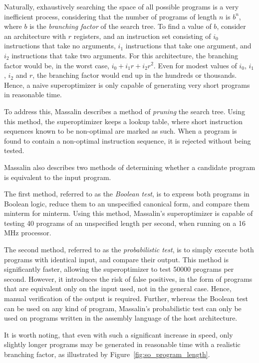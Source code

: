 \documentclass[a4paper,11pt]{kth-mag}
\begin{document}
Naturally, exhaustively searching the space of all possible programs is a very inefficient process, considering that the number of programs of length $n$ is $b^n$, where $b$ is the \emph{branching factor} of the search tree.
To find a value of $b$, consider an architecture with $r$ registers, and an instruction set consisting of $i_0$ instructions that take no arguments, $i_1$ instructions that take one argument, and $i_2$ instructions that take two arguments.
For this architecture, the branching factor would be, in the worst case, $i_0+i_1r+i_2r^2$.
Even for modest values of $i_0$, $i_1$, $i_2$ and $r$, the branching factor would end up in the hundreds or thousands.
Hence, a naive superoptimizer is only capable of generating very short programs in reasonable time.

To address this, Massalin describes a method of \emph{pruning} the search tree.
Using this method, the superoptimizer keeps a lookup table, where short instruction sequences known to be non-optimal are marked as such.
When a program is found to contain a non-optimal instruction sequence, it is rejected without being tested.

Massalin also describes two methods of determining whether a candidate program is equivalent to the input program.

The first method, referred to as the \emph{Boolean test}, is to express both programs in Boolean logic, reduce them to an unspecified canonical form, and compare them minterm for minterm.
Using this method, Massalin's superoptimizer is capable of testing 40 programs of an unspecified length per second, when running on a 16 MHz processor.

The second method, referred to as the \emph{probabilistic test}, is to simply execute both programs with identical input, and compare their output.
This method is significantly faster, allowing the superoptimizer to test 50000 programs per second.
However, it introduces the risk of false positives, in the form of programs that are equivalent only on the input used, not in the general case.
Hence, manual verification of the output is required.
Further, whereas the Boolean test can be used on any kind of program, Massalin's probabilistic test can only be used on programs written in the assembly language of the host architecture.

It is worth noting, that even with such a significant increase in speed, only slightly longer programs may be generated in reasonable time with a realistic branching factor, as illustrated by Figure~\ref{fig:so_program_length}.
\end{document}
